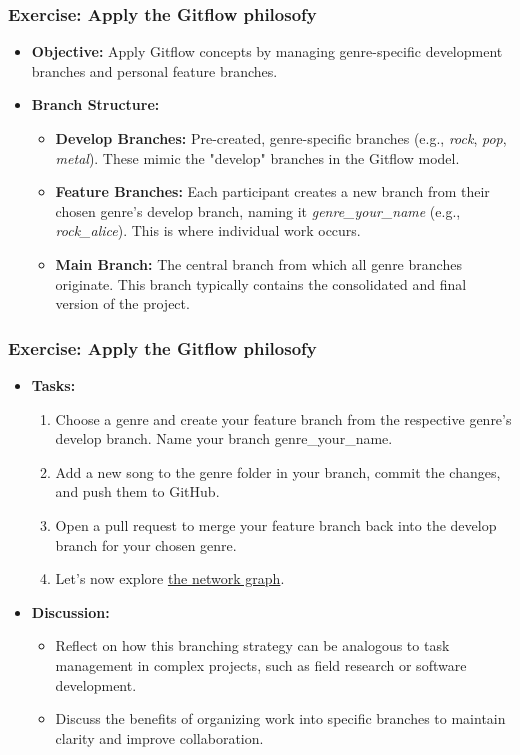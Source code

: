 \documentclass[aspectratio=169]{beamer}
\begin{document}
\begin{frame}
	\frametitle{ Exercise: Apply the Gitflow philosofy}
	\begin{itemize}
		\item \textbf{Objective:} Apply Gitflow concepts by managing genre-specific development branches and personal feature branches.
		\item \textbf{Branch Structure:}
		    \begin{itemize}
		        \item \textbf{Develop Branches:} Pre-created, genre-specific branches (e.g., \textit{rock}, \textit{pop}, \textit{metal}). These mimic the "develop" branches in the Gitflow model.
		        \item \textbf{Feature Branches:} Each participant creates a new branch from their chosen genre's develop branch, naming it \textit{genre\_your\_name} (e.g., \textit{rock\_alice}). This is where individual work occurs.
		        \item \textbf{Main Branch:} The central branch from which all genre branches originate. This branch typically contains the consolidated and final version of the project.
            \end{itemize}
            \end{itemize}

          \end{frame}

          \begin{frame}
          \frametitle{ Exercise: Apply the Gitflow philosofy}
          \begin{itemize}
		 
		\item \textbf{Tasks:}
		\begin{enumerate}
			\item Choose a genre and create your feature branch from the respective genre's develop branch. Name your branch genre\_your\_name.
			\item Add a new song to the genre folder in your branch, commit the changes, and push them to GitHub.
			\item Open a pull request to merge your feature branch back into the develop branch for your chosen genre.
			\item Let's now explore \hyperlink{https://github.com/dime-wb-trainings/lyrics-msfr24/network}{the network graph}.
		\end{enumerate}
		\item \textbf{Discussion:}
		    \begin{itemize}
		        \item Reflect on how this branching strategy can be analogous to task management in complex projects, such as field research or software development.
		        \item Discuss the benefits of organizing work into specific branches to maintain clarity and improve collaboration.
		    \end{itemize}
	    \end{itemize}
      

\end{frame}
\end{document}

